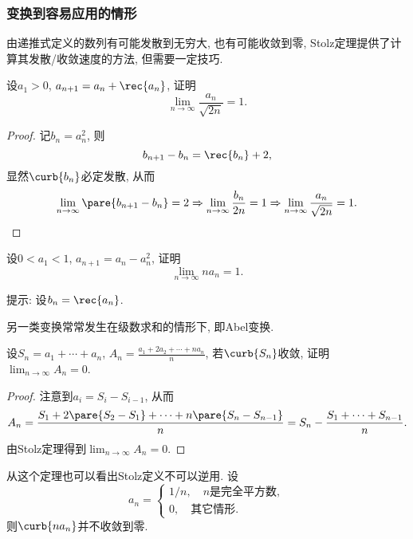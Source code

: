 \documentclass{ctexart}
\begin{document}
\subsubsection{变换到容易应用的情形} %
\label{ssub:变换到容易应用的情形}

由递推式定义的数列有可能发散到无穷大, 也有可能收敛到零, Stolz定理提供了计算其发散/收敛速度的方法, 但需要一定技巧.
\begin{sample}
    \begin{ex}
        设$a_1 > 0$, $\displaystyle a_{n+1} = a_n + \rec{a_n}$, 证明
        \[ \lim_{n\rightarrow\infty} \frac{a_n}{\sqrt{2n}} = 1. \]
    \end{ex}
    \begin{proof}
        记$b_n = a_n^2$, 则
        \[ b_{n+1} - b_n = \rec{b_n} + 2, \]
        显然$\curb{b_n}$必定发散, 从而
        \[ \lim_{n\rightarrow\infty} \pare{b_{n+1} - b_n} = 2 \Rightarrow \lim_{n\rightarrow\infty} \frac{b_n}{2n} = 1\Rightarrow \lim_{n\rightarrow\infty} \frac{a_n}{\sqrt{2n}} = 1.\qedhere \]
    \end{proof}
\end{sample}
\begin{sample}
    \begin{ex}
        设$0<a_1<1$, $a_{n+1} = a_n - a_n^2$, 证明
        \[ \lim_{n\rightarrow\infty} na_n = 1. \]
    \end{ex}
    提示: 设$\displaystyle b_n = \rec{a_n}$.
\end{sample}
另一类变换常常发生在级数求和的情形下, 即Abel变换.
\begin{sample}
    \begin{ex}
        设$S_n = a_1 + \cdots + a_n$, $\displaystyle A_n = \frac{a_1 + 2a_2 + \cdots + na_n}{n}$, 若$\curb{S_n}$收敛, 证明$\displaystyle \lim_{n\rightarrow\infty} A_n = 0$.
    \end{ex}
    \begin{proof}
        注意到$a_i = S_i - S_{i-1}$, 从而
        \[ A_n = \frac{S_1 + 2\pare{S_2 - S_1} + \cdots + n\pare{S_n - S_{n-1}}}{n} = S_n - \frac{S_1 + \cdots + S_{n-1}}{n}. \]
        由Stolz定理得到$\displaystyle \lim_{n\rightarrow\infty} A_n = 0$.
    \end{proof}
\end{sample}
\begin{remark}
    从这个定理也可以看出Stolz定义不可以逆用. 设
    \[ a_n = \begin{cases}
        1/n,\quad n\text{是完全平方数},\\
        0,\quad \text{其它情形}.
    \end{cases} \]
    则$\curb{na_n}$并不收敛到零.
\end{remark}
\end{document}
